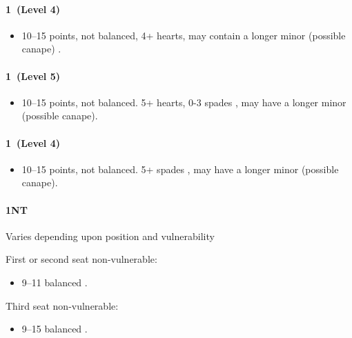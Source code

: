 {\color{CadetBlue}

\paragraph{1\hearts~(Level 4)}

\begin{itemize}
\item 10--15 points, not balanced, 4+ hearts, may contain a longer minor (possible canape) .
\end{itemize}
}

{\it

\paragraph{1\spades~(Level 5)}

\begin{itemize}
\item 10--15 points, not balanced. 5+ hearts, 0-3 spades , may have a longer minor (possible canape).
\end{itemize}

}

{\color{CadetBlue}

\paragraph{1\spades~(Level 4)}

\begin{itemize}
\item 10--15 points, not balanced. 5+ spades , may have a longer minor (possible canape).
\end{itemize}
}

\paragraph{1NT}

Varies depending upon position and vulnerability 

First or second seat non-vulnerable:
\begin{itemize}
\item 9--11 balanced .
\end{itemize}

Third seat non-vulnerable:
\begin{itemize}
\item 9--15 balanced .
\end{itemize}

